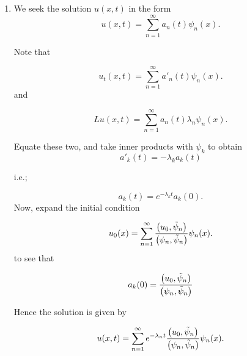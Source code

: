 {\begin{solution}
\begin{enumerate}
\item We seek the solution $u(x, t)$ in the form
\[
u(x, t) = \sum_{n=1}^{\infty} a_n(t) \psi_n(x).
\]

Note that

\[
u_t(x, t) = \sum_{n=1}^{\infty} a'_n(t) \psi_n(x).
\]
and 

\[
Lu(x, t) = \sum_{n=1}^{\infty} a_n(t) \lambda_n \psi_n(x).
\]

Equate these two, and take inner products with $\psi_k$ to obtain
\[
a'_k(t) =  -\lambda_k a_k(t)
\]

i.e.;

\[
a_k(t) =  e^{-\lambda_k t } a_k(0).
\]
Now, expand the initial condition

\[
u_0(x)=  \sum_{n=1}^{\infty}  \frac{\left( u_0, \tilde{\psi}_n \right)}{\left( \psi_n, \tilde{\psi}_n \right)}  \psi_n(x).
\]
to see that 

\[
a_k(0)=\frac{\left( u_0, \tilde{\psi}_n \right)}{\left( \psi_n, \tilde{\psi}_n \right)} 
\]

Hence the solution is given by

\[
u(x, t) = \sum_{n=1}^{\infty} e^{-\lambda_n t } \frac{\left( u_0, \tilde{\psi}_n \right)}{\left( \psi_n, \tilde{\psi}_n \right)}  \psi_n(x).
\]


\end{enumerate}
 \end{solution}
}{}